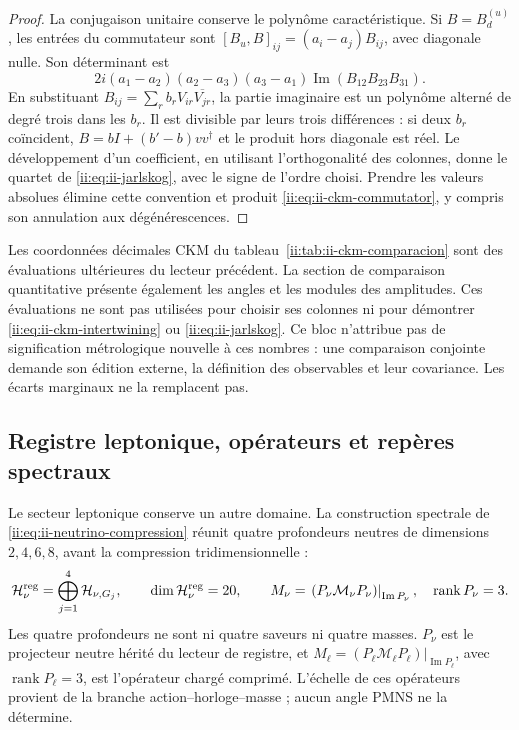 \begin{proof}
La conjugaison unitaire conserve le polynôme caractéristique. Si
\(B=B_d^{(u)}\), les entrées du commutateur sont
\([B_u,B]_{ij}=(a_i-a_j)B_{ij}\), avec diagonale nulle. Son déterminant est
\[
 2i(a_1-a_2)(a_2-a_3)(a_3-a_1)
     \operatorname{Im}(B_{12}B_{23}B_{31}).
\]
En substituant \(B_{ij}=\sum_r b_rV_{ir}\overline{V_{jr}}\), la partie
imaginaire est un polynôme alterné de degré trois dans les \(b_r\).
Il est divisible par leurs trois différences : si deux \(b_r\) coïncident,
\(B=bI+(b'-b)vv^\dagger\) et le produit hors diagonale est réel.
Le développement d'un coefficient, en utilisant l'orthogonalité des colonnes,
donne le quartet de \eqref{ii:eq:ii-jarlskog}, avec le signe de l'ordre choisi.
Prendre les valeurs absolues élimine cette convention et produit
\eqref{ii:eq:ii-ckm-commutator}, y compris son annulation aux dégénérescences.
\end{proof}

\begin{remark}
Les coordonnées décimales CKM du
tableau~\ref{ii:tab:ii-ckm-comparacion} sont des évaluations ultérieures du
lecteur précédent. La section de comparaison quantitative présente également
les angles et les modules des amplitudes. Ces évaluations ne sont pas
utilisées pour choisir ses colonnes ni pour démontrer
\eqref{ii:eq:ii-ckm-intertwining} ou \eqref{ii:eq:ii-jarlskog}.
Ce bloc n'attribue pas de signification métrologique nouvelle à ces nombres :
une comparaison conjointe demande son édition externe, la définition des
observables et leur covariance. Les écarts marginaux ne la remplacent pas.
\end{remark}

\subsection{Registre leptonique, opérateurs et repères spectraux}

Le secteur leptonique conserve un autre domaine. La construction spectrale de
\eqref{ii:eq:ii-neutrino-compression} réunit quatre profondeurs neutres de dimensions
\(2,4,6,8\), avant la compression tridimensionnelle :
\begin{equation}
 \mathcal H_\nu^{\rm reg}
 =\bigoplus_{j=1}^{4}\mathcal H_{\nu,G_j},\qquad
 \dim\mathcal H_\nu^{\rm reg}=20,\qquad
 M_\nu=\left.(P_\nu\mathcal M_\nu P_\nu)\right|_{\operatorname{Im}P_\nu},
 \quad\operatorname{rank}P_\nu=3.
 \label{ii:eq:ii-neutrino-compression}
\end{equation}
Les quatre profondeurs ne sont ni quatre saveurs ni quatre masses.
\(P_\nu\) est le projecteur neutre hérité du lecteur de registre, et
\(M_\ell=\left.(P_\ell\mathcal M_\ell P_\ell)\right|_{\operatorname{Im}P_\ell}\),
avec \(\operatorname{rank}P_\ell=3\), est l'opérateur chargé comprimé.
L'échelle de ces opérateurs provient de la branche action--horloge--masse ;
aucun angle PMNS ne la détermine.

